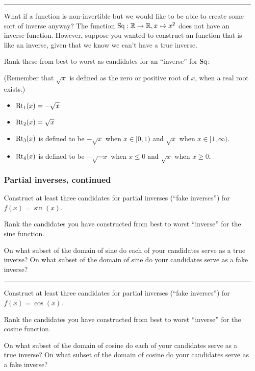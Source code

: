 \documentclass[11pt]{article}
\newcommand\tn{\textnormal}
\newcommand{\R}{\mathbb{R}}
\theoremstyle{definition}
\begin{document}
\vfill 

\vspace*{2pt}\hrule\vspace*{2pt}
What if a function is non-invertible but we would like to be able to create some sort of inverse anyway? 
The function $\tn{Sq}:\R\to\R, x\mapsto x^2$ does not have an inverse function. However, suppose you wanted to construct an function that is like an inverse, given that we know we can't have a true inverse.

Rank these from best to worst as candidates for an ``inverse'' for $\tn{Sq}$:

(Remember that $\sqrt{x}$ is defined as the zero or positive root of $x$, when a real root exists.)

\begin{itemize}[label=$\circ$]
\item $\tn{Rt}_1(x)=-\sqrt{x}$ 
\item $\tn{Rt}_2(x)=\sqrt{x}$
\item $\tn{Rt}_3(x)$ is defined to be $-\sqrt{x}$ when $x\in[0,1)$ and $\sqrt{x}$ when $x\in [1,\infty)$.
\item $\tn{Rt}_4(x)$ is defined to be $-\sqrt{-x}$ when $x\leq 0$ and $\sqrt{x}$ when $x\geq 0$.
\end{itemize}

\vfill
\newpage
\subsubsection*{Partial inverses, continued}

Construct at least three candidates for partial inverses (``fake inverses'') for $f(x)=\sin(x)$. 

Rank the candidates you have constructed from best to worst ``inverse'' for the sine function.

On what subset of the domain of sine do each of your candidates serve as a true inverse? On what subset of the domain of sine do your candidates serve as a fake inverse? 

\vspace*{2pt} \hrule \vspace*{2pt}
Construct at least three candidates for partial inverses (``fake inverses'') for $f(x)=\cos(x)$. 

Rank the candidates you have constructed from best to worst ``inverse'' for the cosine function.

On what subset of the domain of cosine do each of your candidates serve as a true inverse? On what subset of the domain of cosine do your candidates serve as a fake inverse? 
\end{document}
